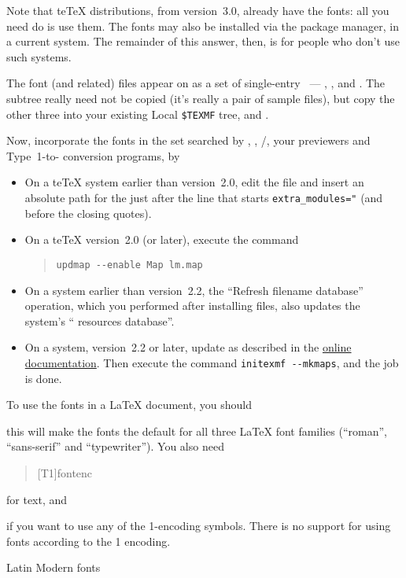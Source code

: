 Note that te\TeX{} distributions, from version~3.0, already have the
 fonts: all you need do is use them.  The fonts may also
be installed via the package manager, in a current \miktex{} system.
The remainder of this answer, then, is for people who don't use such
systems.

The font (and related) files appear on  as a set of
single-entry ~---
, ,  and .  The 
subtree really need not be copied (it's really a pair of sample
files), but copy the other three into your existing Local
\texttt{\$TEXMF} tree, and
.

Now, incorporate the fonts in the set searched by \PDFLaTeX{},
, /, your
previewers and Type~1-to- conversion programs, by
\begin{itemize}
\item On a te\TeX{} system earlier than version~2.0, edit the file
  and insert an absolute path for the  just after the
  line that starts \texttt{extra\_modules="} (and before the closing
  quotes).
\item On a te\TeX{} version~2.0 (or later), execute the command
\begin{quote}
\begin{verbatim}
updmap --enable Map lm.map
\end{verbatim}
\end{quote}
\item On a \miktex{} system earlier than version~2.2, the ``Refresh
  filename database'' operation, which you performed after installing
  files, also updates the system's ``\PS{} resources database''.
\item On a \miktex{} system, version~2.2 or later, update
   as described in the \miktex{} %
  \href{http://docs.miktex.org/manual/psfonts.html#chgupdmapcfg}{online documentation}.
  Then execute the command \texttt{initexmf -\relax-mkmaps}, and the
  job is done.
\end{itemize}

To use the fonts in a \LaTeX{} document, you should
\begin{quote}
\end{quote}
this will make the fonts the default
for all three \LaTeX{} font families (``roman'', ``sans-serif'' and
``typewriter'').  You also need 
\begin{quote}
  [T1]{fontenc}
\end{quote}
for text, and 
\begin{quote}
\end{quote}
if you want to use any of the 1-encoding symbols.  There is
no support for using fonts according to the 1 encoding.
\begin{ctanrefs}
\item[\nothtml{\rmfamily}Latin Modern fonts]
\end{ctanrefs}


